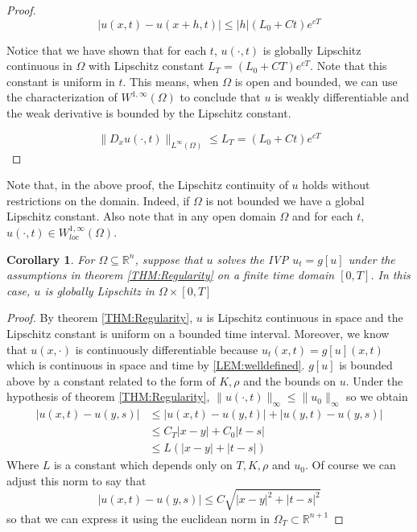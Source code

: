 \documentclass[aps,
preprint,
groupedaddress,
showkeys,
amsmath]{revtex4-2}
\newtheorem{corollary}{Corollary}
\begin{document}
\begin{proof}
        \[
            |u(x,t)-u(x+h,t)|\leq |h|(L_0+Ct)e^{cT}
        \]

        Notice that we have shown that for each $t$, $u(\cdot,t)$ is globally Lipschitz continuous in $\Omega$ with Lipschitz constant $L_T=(L_0+CT)e^{cT}$. Note that this constant is uniform in $t$. This means, when $\Omega$ is open and bounded, we can use the characterization of $W^{1,\infty}(\Omega)$ \cite{evansPDE} to conclude that $u$ is weakly differentiable and the weak derivative is bounded by the Lipschitz constant.
        
         \[\|D_xu(\cdot,t)\|_{L^\infty(\Omega)}\leq L_T=(L_0+Ct)e^{cT}\]
         
    \end{proof}

    Note that, in the above proof, the Lipschitz continuity of $u$ holds without restrictions on the domain. Indeed, if $\Omega$ is not bounded we have a global Lipschitz constant. Also note that in any open domain $\Omega$ and for each $t,$ $u(\cdot, t)\in W^{1,\infty}_{loc}(\Omega)$.

    \begin{corollary}
        For $\Omega \subseteq \mathbb{R}^n$, suppose that $u$ solves the IVP $u_t=g[u]$ under the assumptions in theorem \ref{THM:Regularity} on a finite time domain $[0,T]$. In this case, $u$ is globally Lipschitz in $\Omega\times[0,T]$
    \end{corollary}

    \begin{proof}
        By theorem \ref{THM:Regularity}, $u$ is Lipschitz continuous in space and the Lipschitz constant is uniform on a bounded time interval. Moreover, we know that $u(x,\cdot)$ is continuously differentiable because $u_t(x,t)=g[u](x,t)$ which is continuous in space and time by \ref{LEM:welldefined}. $g[u]$ is bounded above by a constant related to the form of $K,\rho$ and the bounds on $u$. Under the hypothesis of theorem \ref{THM:Regularity}, $\|u(\cdot, t)\|_\infty\leq \|u_0\|_\infty$ so we obtain  
        \begin{equation*}
            \begin{split}
                |u(x,t)-u(y,s)|&\leq |u(x,t)-u(y,t)|+|u(y,t)-u(y,s)|\\
                &\leq C_T|x-y|+C_{0}|t-s|\\
                &\leq L(|x-y|+|t-s|)
            \end{split}
        \end{equation*}
        Where $L$ is a constant which depends only on $T, K, \rho$ and $u_0$. Of course we can adjust this norm to say that 
        \[|u(x,t)-u(y,s)|\leq C \sqrt{|x-y|^2+|t-s|^2}\]
        so that we can express it using the euclidean norm in $\Omega_T\subset \mathbb{R}^{n+1}$
    \end{proof}
\end{document}
